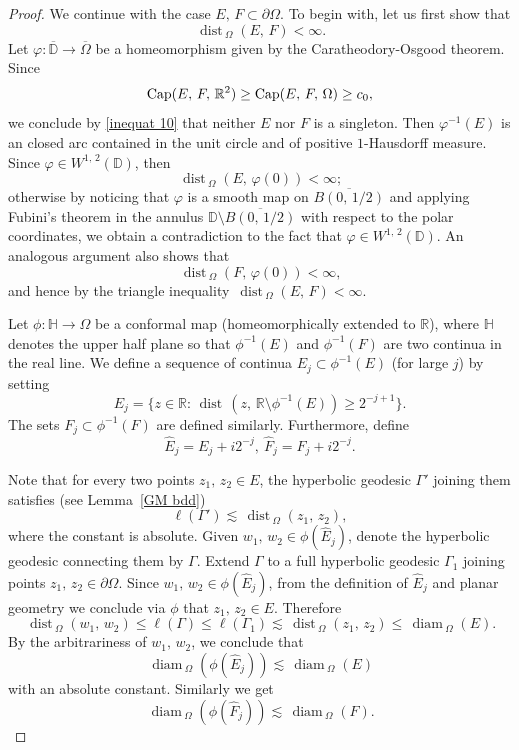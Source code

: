 \documentclass[reqno,11pt]{amsart}
\def\dist{{\mathop\mathrm{\,dist\,}}}
\def\diam{{\mathop\mathrm{\,diam\,}}}
\numberwithin{equation}{section}
\theoremstyle{remark}
\begin{document}
\begin{proof}
 We continue with the case $E,\,F\subset\partial\Omega$. 
To begin with, let us first show that 
$$\dist_{\Omega}(E,\,F)<\infty. $$
Let $\varphi\colon \overline{\mathbb D} \to \overline{\Omega}$ be a homeomorphism given by the Caratheodory-Osgood theorem. 
Since 
$${\rm Cap}(E,\,F,\, \mathbb R^2)\ge {\rm Cap}(E,\,F,\, \Omega)\ge c_0,$$
we conclude by \eqref{inequat 10} that neither $E$ nor $F$ is a singleton. 
Then $\varphi^{-1}(E)$ is an closed arc contained in the unit circle and of positive $1$-Hausdorff measure. Since $\varphi\in W^{1,\,2}(\mathbb D)$, then
$$\dist_{\Omega}(E,\,\varphi(0))<\infty;$$
otherwise by noticing that $\varphi$ is a smooth map on $\overline{B(0,\,1/2)}$ and applying Fubini's theorem  in the annulus $\mathbb D \setminus \overline{B(0,\,1/2)}$ with respect to the polar coordinates, we obtain a contradiction to the fact that $\varphi\in W^{1,\,2}(\mathbb D)$. 
An analogous argument also shows that 
$$\dist_{\Omega}(F,\,\varphi(0))<\infty,$$
and hence by the triangle inequality $\dist_{\Omega}(E,\,F)<\infty. $



Let $\phi\colon \mathbb H\to \Omega$ be a conformal map (homeomorphically extended  to  $\mathbb R$), where $\mathbb H$ denotes the upper half plane so that $\phi^{-1}(E)$ and $\phi^{-1}(F)$ are two continua in the real line. 
We define a sequence of continua $E_j \subset  \phi^{-1}(E)$ (for large $j$) by setting
$$ E_j =\{ z \in \mathbb R \colon   \dist(z,\,\mathbb R \setminus \phi^{-1}(E))\ge 2^{-j+1}\}. $$
The sets $ F_j\subset \phi^{-1}(F)$ are defined similarly. 
Furthermore, define
$$\hat E_j= E_j +i  2^{-j}, \ \hat F_j= F_j +i 2^{-j}. $$


Note that for every two points $z_1,\,z_2\in E$, the hyperbolic geodesic $\Gamma'$ joining them satisfies (see Lemma~\ref{GM bdd})
$$\ell(\Gamma')\lesssim \dist_{\Omega}(z_1,\,z_2), $$
where the constant is absolute. 
Given $w_1,\,w_2\in \phi(\hat E_j)$, denote the hyperbolic geodesic connecting them by $\Gamma$. Extend $\Gamma$ to a full hyperbolic geodesic $\Gamma_1$ joining points $z_1,\,z_2\in \partial \Omega$. Since $w_1,\,w_2\in \phi(\hat E_j)$, from the definition of $\hat E_j$ and planar geometry  we conclude via $\phi$ that $z_1,\,z_2\in  E$. Therefore
$$\dist_{\Omega}(w_1,\,w_2)\le \ell(\Gamma)\le \ell(\Gamma_1)\lesssim \dist_{\Omega}(z_1,\,z_2)\le \diam_{\Omega}(E). $$
By the arbitrariness of $w_1,\,w_2$, we conclude that
\begin{equation}\label{inequ 19}
\diam_{\Omega}(\phi(\hat E_j)) \lesssim  \diam_{\Omega}(E) 
\end{equation}
with an absolute constant. Similarly we get  
\begin{equation}\label{inequ 20}
\diam_{\Omega}(\phi(\hat F_j)) \lesssim  \diam_{\Omega}(F). 
\end{equation}


\end{proof}
\end{document}
